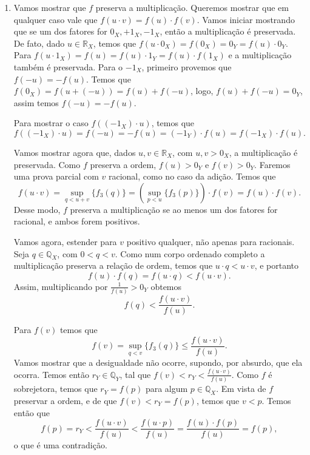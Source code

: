 \documentclass[../main.tex]{subfiles}
\begin{document}
\begin{dem}
\begin{enumerate}
\begin{enumerate}
            \item Vamos mostrar que $f$ preserva a multiplicação.
            Queremos mostrar que em qualquer caso vale que $f(u\cdot v) = f(u) \cdot f(v)$.
            Vamos iniciar mostrando que se um dos fatores for $0_X, +1_X, -1_X$, então a multiplicação é preservada. De fato, dado $u \in \mathbb{R}_X$, temos que
            $f(u \cdot 0_X) = f(0_X) = 0_Y = f(u) \cdot 0_Y$. \\ 
            Para $f(u \cdot 1_X) = f(u) = f(u) \cdot 1_Y = f(u) \cdot f(1_X)$ e a multiplicação também é preservada. Para o $-1_X$, primeiro provemos que $f(-u) = -f(u)$. Temos que $f(0_X) = f(u+(-u)) = f(u) + f(-u)$, logo, $f(u) + f(-u) = 0_Y$, assim temos $f(-u) = -f(u)$. 

            Para mostrar o caso $f((-1_X) \cdot u)$, temos que
            \[ f((-1_X) \cdot u) = f(-u) = -f(u) = (-1_Y) \cdot f(u) = f(-1_X) \cdot f(u). \]

            Vamos mostrar agora que, dados $u,v \in \mathbb{R}_X$, com $u,v > 0_X$, a multiplicação é preservada. Como $f$ preserva a ordem, $f(u) > 0_Y$ e $f(v) > 0_Y$. Faremos uma prova parcial com $v$ racional, como no caso da adição. Temos que
            \[ f(u \cdot v) = \sup_{q < u+v}\{f_3(q)\} = \left( \sup_{p<u}\{f_3(p)\} \right) \cdot f(v) = f(u) \cdot f(v). \]
            Desse modo, $f$ preserva a multiplicação se ao menos um dos fatores for racional, e ambos forem positivos.

            Vamos agora, estender para $v$ positivo qualquer, não apenas para racionais. Seja $q \in \mathbb{Q}_X$, com $0 < q < v$. 
            Como num corpo ordenado completo a multiplicação preserva a relação de ordem, temos que $u\cdot q < u\cdot v$, e portanto
            \[ f(u) \cdot f(q) = f(u \cdot q) < f(u \cdot v). \]
            Assim, multiplicando por $\frac{1}{f(u)} > 0_Y$ obtemos
            \[ f(q) < \frac{f(u \cdot  v)}{f(u)} .\]

            Para $f(v)$ temos que
            \[ f(v) = \sup_{q<v}\{f_3(q)\} \leq \frac{f(u \cdot v)}{f(u)}.\]
            Vamos mostrar que a desigualdade não ocorre, supondo, por absurdo, que ela ocorra. 
            Temos então $r_Y \in \mathbb{Q}_Y$, tal que $f(v) < r_Y < \frac{f(u \cdot v)}{f(u)}$. Como $f$ é sobrejetora, temos que $r_Y = f(p)$ para algum $p \in \mathbb{Q}_X$.
            Em vista de $f$ preservar a ordem, e de que $f(v) < r_Y = f(p)$, temos que $v < p$. Temos então que
            \[ f(p) = r_Y < \frac{f(u \cdot v)}{f(u)} < \frac{f(u \cdot p)}{f(u)} = \frac{f(u) \cdot f(p)}{f(u)} = f(p),\]
            o que é uma contradição.


\end{enumerate}
\end{enumerate}
\end{dem}
\end{document}
